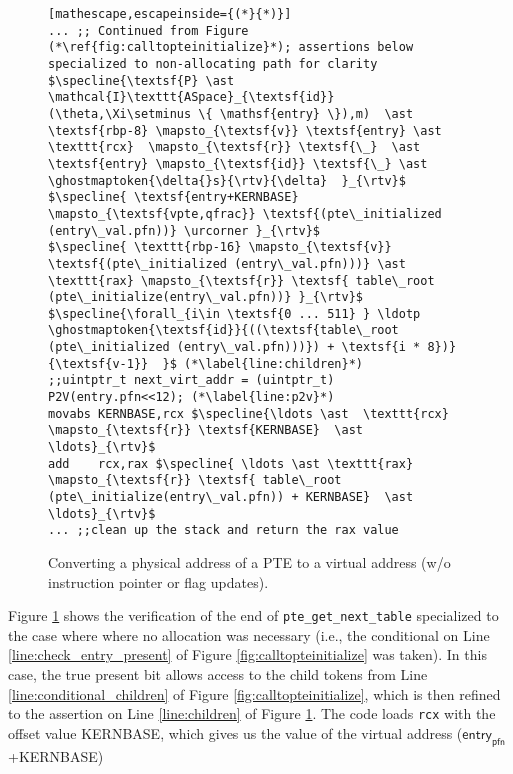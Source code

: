 \begin{figure}\footnotesize
\begin{lstlisting}[mathescape,escapeinside={(*}{*)}]
... ;; Continued from Figure (*\ref{fig:calltopteinitialize}*); assertions below specialized to non-allocating path for clarity
$\specline{\textsf{P} \ast \mathcal{I}\texttt{ASpace}_{\textsf{id}}(\theta,\Xi\setminus \{ \mathsf{entry} \}),m)  \ast \textsf{rbp-8} \mapsto_{\textsf{v}} \textsf{entry} \ast \texttt{rcx}  \mapsto_{\textsf{r}} \textsf{\_}  \ast \textsf{entry} \mapsto_{\textsf{id}} \textsf{\_} \ast \ghostmaptoken{\delta{}s}{\rtv}{\delta}  }_{\rtv}$
$\specline{ \textsf{entry+KERNBASE} \mapsto_{\textsf{vpte,qfrac}} \textsf{(pte\_initialized (entry\_val.pfn))} \urcorner }_{\rtv}$
$\specline{ \texttt{rbp-16} \mapsto_{\textsf{v}} \textsf{(pte\_initialized (entry\_val.pfn)))} \ast \texttt{rax} \mapsto_{\textsf{r}} \textsf{ table\_root (pte\_initialize(entry\_val.pfn))} }_{\rtv}$
$\specline{\forall_{i\in \textsf{0 ... 511} } \ldotp  \ghostmaptoken{\textsf{id}}{((\textsf{table\_root (pte\_initialized (entry\_val.pfn)))}) + \textsf{i * 8})}{\textsf{v-1}}  }$ (*\label{line:children}*)
;;uintptr_t next_virt_addr = (uintptr_t) P2V(entry.pfn<<12); (*\label{line:p2v}*) 
movabs KERNBASE,rcx $\specline{\ldots \ast  \texttt{rcx}  \mapsto_{\textsf{r}} \textsf{KERNBASE}  \ast \ldots}_{\rtv}$
add    rcx,rax $\specline{ \ldots \ast \texttt{rax} \mapsto_{\textsf{r}} \textsf{ table\_root (pte\_initialize(entry\_val.pfn)) + KERNBASE}  \ast \ldots}_{\rtv}$
... ;;clean up the stack and return the rax value
\end{lstlisting}
\vspace{-1em}
\caption{Converting a physical address of a PTE to a virtual address (w/o instruction pointer or flag updates).
\vspace{-1em}
}
\label{fig:p2v}
\end{figure}
Figure \ref{fig:p2v} shows the verification of the end of \lstinline|pte_get_next_table| specialized to the case where 
where no allocation was necessary (i.e., the conditional on Line \ref{line:check_entry_present} of Figure \ref{fig:calltopteinitialize} was taken).
In this case, the true present bit allows access to the child tokens from Line \ref{line:conditional_children} of Figure \ref{fig:calltopteinitialize},
which is then refined to the assertion on Line \ref{line:children} of Figure \ref{fig:p2v}.
The code loads \lstinline|rcx| with the offset value \textsf{KERNBASE}, which gives us the value of the virtual address ($\textsf{entry}_{\textsf{pfn}}$ \textsf{+KERNBASE})
